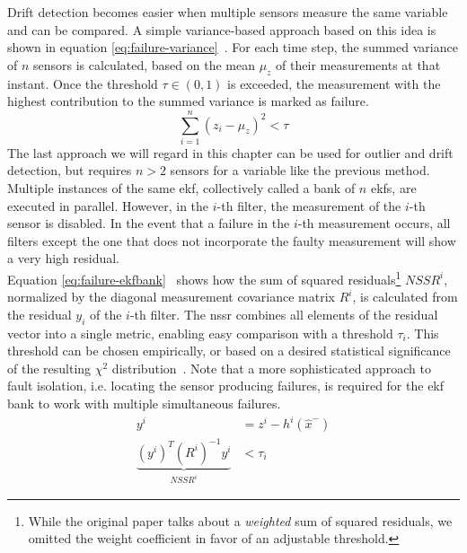 Drift detection becomes easier when multiple sensors measure the same variable and can be compared. A simple variance-based approach based on this idea is shown in equation \ref{eq:failure-variance}~\cite[p.~20]{Kabzan.2019}. For each time step, the summed variance of $n$ sensors is calculated, based on the mean $\mu_z$ of their measurements at that instant. Once the threshold $\tau \in (0, 1)$ is exceeded, the measurement with the highest contribution to the summed variance is marked as failure.
\begin{equation}\label{eq:failure-variance}%
\sum_{i=1}^n (z_i - \mu_z)^2 < \tau%
\end{equation}
The last approach we will regard in this chapter can be used for outlier and drift detection, but requires $n>2$ sensors for a variable like the previous method. Multiple instances of the same \gls{ekf}, collectively called a bank of $n$ \gls{ekf}s, are executed in parallel. However, in the $i$-th filter, the measurement of the $i$-th sensor is disabled. In the event that a failure in the $i$-th measurement occurs, all filters except the one that does not incorporate the faulty measurement will show a very high residual. \\ Equation \ref{eq:failure-ekfbank}~\cite[p.~3]{Kobayashi.2003} shows how the sum of squared residuals\footnote{While the original paper talks about a \textit{weighted} sum of squared residuals, we omitted the weight coefficient in favor of an adjustable threshold.} $\textit{NSSR}^i$, normalized by the diagonal measurement covariance matrix $R^i$, is calculated from the residual $y_i$ of the $i$-th filter. The \gls{nssr} combines all elements of the residual vector into a single metric, enabling easy comparison with a threshold $\tau_i$. This threshold can be chosen empirically, or based on a desired statistical significance of the resulting $\chi^2$ distribution~\cite[p.~3]{Xue.2007}. Note that a more sophisticated approach to fault isolation, i.e. locating the sensor producing failures, is required for the \gls{ekf} bank to work with multiple simultaneous failures.
\begin{subequations}\label{eq:failure-ekfbank}
\begin{alignat}{2}%
y^i &= z^i - h^i(\hat{x}^-) \\%
\underbrace{(y^i)^T (R^i)^{-1} y^i}_\textrm{$\textit{NSSR}^i$} &< \tau_i%
\end{alignat}
\end{subequations}
